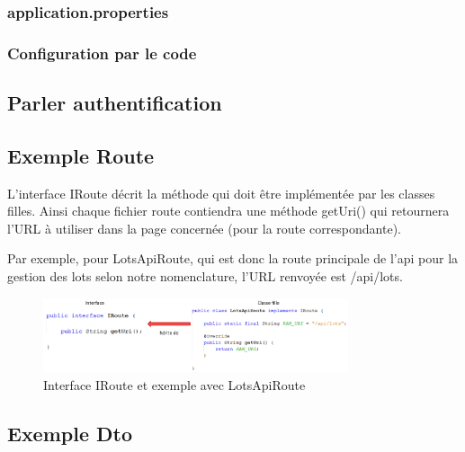 			\subsubsection{application.properties}


			\subsubsection{Configuration par le code}


		\subsection{Parler authentification}


		\subsection{Exemple Route}

			L'interface IRoute décrit la méthode qui doit être implémentée par les classes filles.\newline
			Ainsi chaque fichier route contiendra une méthode getUri() qui retournera l'URL à utiliser dans la page concernée (pour la route correspondante).

			\noindent
			Par exemple, pour LotsApiRoute, qui est donc la route principale de l'api pour la gestion des lots selon notre nomenclature, l'URL renvoyée est /api/lots.

			\begin{figure}[H]
				\centering\includegraphics[width=0.80\textwidth, keepaspectratio]{res/IRoute.png}
				\caption{Interface IRoute et exemple avec LotsApiRoute}
			\end{figure}


		\subsection{Exemple Dto}



